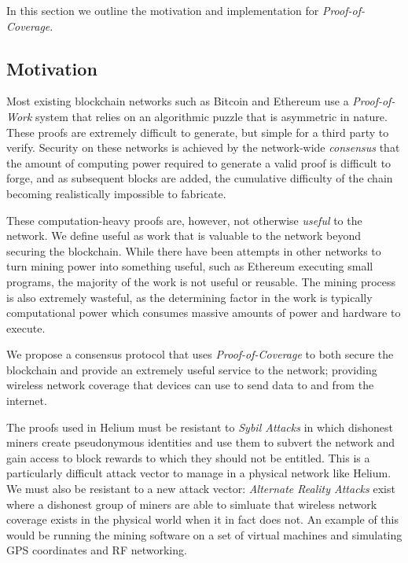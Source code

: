 \documentclass[letterpaper,11pt]{article}
\def\proofofcoverage/{\textit{Proof-of-Coverage}}
\begin{document}
In this section we outline the motivation and implementation for \proofofcoverage/.

\subsection{Motivation}

Most existing blockchain networks such as Bitcoin \cite{bitcoin} and Ethereum \cite{ethereum} use a \textit{Proof-of-Work} system that relies on an algorithmic puzzle that is asymmetric in nature. These proofs are extremely difficult to generate, but simple for a third party to verify. Security on these networks is achieved by the network-wide \textit{consensus} that the amount of computing power required to generate a valid proof is difficult to forge, and as subsequent blocks are added, the cumulative difficulty of the chain becoming realistically impossible to fabricate. \newline

These computation-heavy proofs are, however, not otherwise \textit{useful} to the network. We define useful as work that is valuable to the network beyond securing the blockchain. While there have been attempts in other networks to turn mining power into something useful, such as Ethereum executing small programs, the majority of the work is not useful or reusable. The mining process is also extremely wasteful, as the determining factor in the work is typically computational power which consumes massive amounts of power and hardware to execute.\newline

We propose a consensus protocol that uses \proofofcoverage/ to both secure the blockchain and provide an extremely useful service to the network; providing wireless network coverage that devices can use to send data to and from the internet.\newline

The proofs used in Helium must be resistant to \textit{Sybil Attacks} in which dishonest miners create pseudonymous identities and use them to subvert the network and gain access to block rewards to which they should not be entitled. This is a particularly difficult attack vector to manage in a physical network like Helium. We must also be resistant to a new attack vector: \textit{Alternate Reality Attacks} exist where a dishonest group of miners are able to simluate that wireless network coverage exists in the physical world when it in fact does not. An example of this would be running the mining software on a set of virtual machines and simulating GPS coordinates and RF networking.
\end{document}
